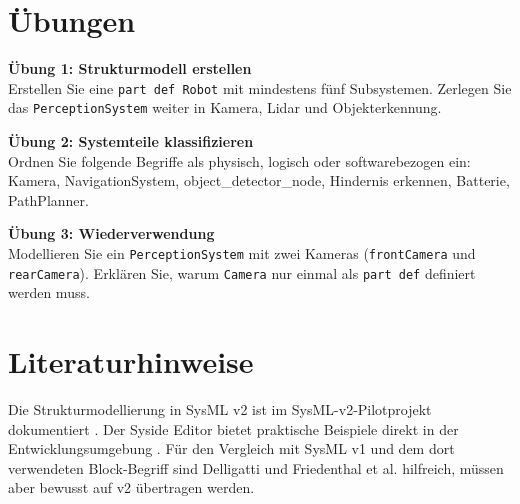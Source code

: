 \section{Übungen}
\begin{uebungbox}
\textbf{Übung 1: Strukturmodell erstellen}\\
Erstellen Sie eine \texttt{part def Robot} mit mindestens fünf Subsystemen. Zerlegen Sie das \texttt{PerceptionSystem} weiter in Kamera, Lidar und Objekterkennung.
\end{uebungbox}

\begin{uebungbox}
\textbf{Übung 2: Systemteile klassifizieren}\\
Ordnen Sie folgende Begriffe als physisch, logisch oder softwarebezogen ein: Kamera, NavigationSystem, object\_detector\_node, Hindernis erkennen, Batterie, PathPlanner.
\end{uebungbox}

\begin{uebungbox}
\textbf{Übung 3: Wiederverwendung}\\
Modellieren Sie ein \texttt{PerceptionSystem} mit zwei Kameras (\texttt{frontCamera} und \texttt{rearCamera}). Erklären Sie, warum \texttt{Camera} nur einmal als \texttt{part def} definiert werden muss.
\end{uebungbox}

\section{Literaturhinweise}
Die Strukturmodellierung in SysML v2 ist im SysML-v2-Pilotprojekt dokumentiert \cite{sysmlv2pilot}. Der Syside Editor bietet praktische Beispiele direkt in der Entwicklungsumgebung \cite{syside}. Für den Vergleich mit SysML v1 und dem dort verwendeten Block-Begriff sind Delligatti \cite{delligatti2014} und Friedenthal et al. \cite{friedenthal2014} hilfreich, müssen aber bewusst auf v2 übertragen werden.
